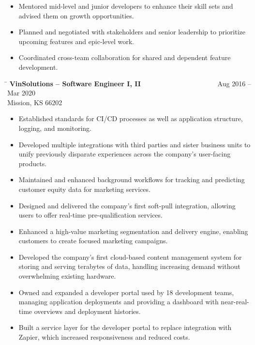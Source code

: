 \documentclass{res}
\begin{document}
\begin{resume}
\begin{changemargin}{-0.25in}{0in}
\begin{itemize}
		\item Mentored mid-level and junior developers to enhance their skill sets and advised them on growth opportunities.
		\item Planned and negotiated with stakeholders and senior leadership to prioritize upcoming features and epic-level work.
		\item Coordinated cross-team collaboration for shared and dependent feature development.
		\vspace{-15pt}
	\end{itemize}
	\vspace{0.2in}
	\begin{tabbing}
		\hspace{5.5in}\= \kill 
		{\bf VinSolutions – Software Engineer I, II} \>~~~~~~~~~~~~~~~~~~~~~~Aug 2016 – Mar 2020\\
		Mission, KS 66202
	\end{tabbing}\vspace{-1pt}
	\begin{itemize}
		\item Established standards for CI/CD processes as well as application structure, logging, and monitoring.
		\item Developed multiple integrations with third parties and sister business units to unify previously disparate experiences across the company’s user-facing products.
		\item Maintained and enhanced background workflows for tracking and predicting customer equity data for marketing services.
		\item Designed and delivered the company’s first soft-pull integration, allowing users to offer real-time pre-qualification services.
		\item Enhanced a high-value marketing segmentation and delivery engine, enabling customers to create focused marketing campaigns.
		\item Developed the company’s first cloud-based content management system for storing and serving terabytes of data, handling increasing demand without overwhelming existing hardware.
		\item Owned and expanded a developer portal used by 18 development teams, managing application deployments and providing a dashboard with near-real-time overviews and deployment histories.
		\item Built a service layer for the developer portal to replace integration with Zapier, which increased responsiveness and reduced costs.
		\vspace{-15pt}

\end{itemize}
\end{changemargin}
\end{resume}
\end{document}
